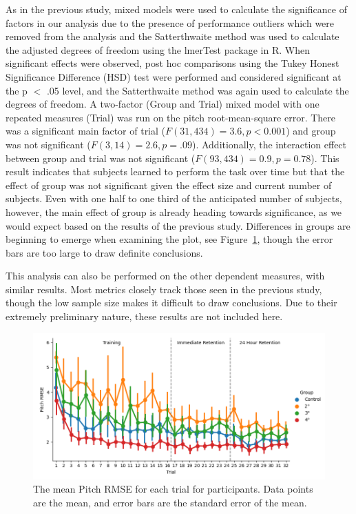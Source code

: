 As in the previous study, mixed models were used to calculate the significance of factors in our analysis due to the presence of performance outliers which were removed from the analysis and the Satterthwaite method was used to calculate the adjusted degrees of freedom using the lmerTest package in R.
When significant effects were observed, post hoc comparisons using the Tukey Honest Significance Difference (HSD) test were performed and considered significant at the p $<$ .05 level, and the Satterthwaite method was again used to calculate the degrees of freedom.
A two-factor (Group and Trial) mixed model with one repeated measures (Trial) was run on the pitch root-mean-square error.
There was a significant main factor of trial ($F(31, 434) = 3.6, p < 0.001$) and group was not significant ($F(3, 14) = 2.6, p = .09$).
Additionally, the interaction effect between group and trial was not significant ($F(93, 434) = 0.9, p = 0.78$).
This result indicates that subjects learned to perform the task over time but that the effect of group was not significant given the effect size and current number of subjects.
Even with one half to one third of the anticipated number of subjects, however, the main effect of group is already heading towards significance, as we would expect based on the results of the previous study.
Differences in groups are beginning to emerge when examining the plot, see Figure~\ref{figure-bw:pitchrmse}, though the error bars are too large to draw definite conclusions.

This analysis can also be performed on the other dependent measures, with similar results.
Most metrics closely track those seen in the previous study, though the low sample size makes it difficult to draw conclusions.
Due to their extremely preliminary nature, these results are not included here.

\begin{figure}[tb!]
    \begin{center}
        \includegraphics[width=\linewidth]{figures/Aircraft/Bandwidth-PitchRMSE.png}
        \caption[The mean Pitch RMSE for each trial]{The mean Pitch RMSE for each trial for participants. Data points are the mean, and error bars are the standard error of the mean.}
        \label{figure-bw:pitchrmse}
    \end{center}
\end{figure}

